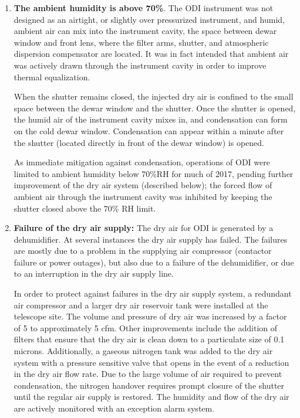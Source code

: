 \documentclass[]{spieman}
\begin{document}
\begin{enumerate}

\item {\bf The ambient humidity is above 70\%}. The ODI instrument was not
designed as an airtight, or slightly over pressurized instrument, and humid,
ambient air can mix into the instrument cavity, the space between dewar window
and front lens, where the filter arms, shutter, and atmospheric dispersion
compensator are located. It was in fact intended that ambient air was actively
drawn through	the instrument cavity in order to improve thermal equalization.

When the shutter remains closed, the injected dry air is confined to the small
space between the dewar window and the shutter. Once the shutter is opened, the 
humid air of the instrument cavity mixes in, and condensation can form on the
cold dewar window. Condensation can appear within a minute after the shutter
(located directly in front of the dewar window) is opened.

As immediate mitigation against condensation, operations of ODI were limited to
ambient humidity below 70\%RH for much of 2017, pending further improvement of
the dry air system (described below); the forced flow of ambient air through the
instrument cavity was inhibited by keeping the shutter closed above the 70\% RH
limit.

\item {\bf Failure of the dry air supply:} The dry air for ODI is generated by a
dehumidifier. At several instances the dry air supply has failed. The failures
are mostly due to a problem in the supplying air compressor (contactor failure
or power outages), but also due to a failure of the dehumidifier, or due to an
interruption in the dry air supply line.

In order to protect against failures in the dry air supply system, a redundant
air compressor and a larger dry air reservoir tank were installed at the
telescope site. The volume and pressure of dry air was increased by a factor of
5 to approximately 5 cfm. Other improvements include the addition of filters
that ensure that the dry air is clean down to a particulate size of 0.1 microns.
Additionally, a gaseous nitrogen tank was added to the dry air system with a
pressure sensitive valve that opens in the event of a reduction in the dry air
flow rate. Due to the large volume of air required to prevent condensation, the
nitrogen handover requires prompt closure of the shutter until the regular air
supply is restored. The humidity and flow of the dry air are actively monitored
with an exception alarm system.


\end{enumerate}
\end{document}
